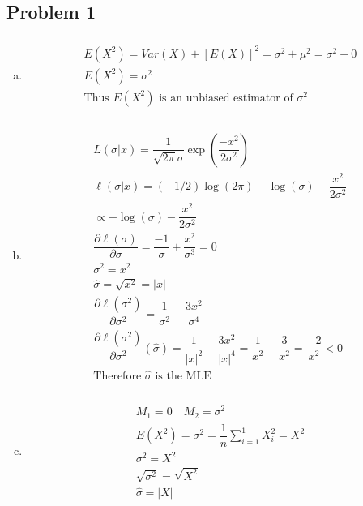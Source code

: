 \documentclass{article}
\newcommand{\sg}{\sigma}
\newcommand{\dll}[1]{\dfrac{\partial\ell({#1})}{\partial{#1}}}
\begin{document}
\begin{flushleft}

	\section*{Problem 1}
	
\begin{enumerate}[(a)]
	
	\item 
\begin{multline*}\\
E(X^2)=Var(X)+[E(X)]^2=\sigma^2+\mu^2=\sigma^2+0\\
E(X^2)=\sg^2\\
\text{Thus } E(X^2) \text{ is an unbiased estimator of } \sg^2\\
\end{multline*}

	\item 
\begin{multline*}\\
L(\sigma|x)= \dfrac{1}{\sqrt{2\pi}\sigma}\exp\left(\dfrac{-x^2}{2\sigma^2} \right)\\
\ell(\sigma|x)=(-1/2)\log(2\pi)-\log(\sigma)-\dfrac{x^2}{2\sigma^2}\\
\propto -\log(\sigma)-\dfrac{x^2}{2\sigma^2}\\
\dll{\sg}=\dfrac{-1}{\sigma}+\dfrac{x^2}{\sigma^3}=0\\
\sigma^2=x^2\\
\hat{\sigma}=\sqrt{x^2}=|x|\\
\dll{\sigma^2}=\dfrac{1}{\sigma^2}-\dfrac{3x^2}{\sg^4}\\
\dll{\sigma^2}(\hat{\sg})=\dfrac{1}{|x|^2}-\dfrac{3x^2}{|x|^4}=\dfrac{1}{x^2}-\dfrac{3}{x^2}=\dfrac{-2}{x^2}<0\\
\text{Therefore } \hat{\sg} \text{ is the MLE}\\
\end{multline*}

	\item 
\begin{multline*}\\
M_1=0 \quad M_2=\sigma^2\\
E(X^2)=\sigma^2=\dfrac{1}{n}\sum_{i=1}^{1} X_i^2=X^2\\
\sigma^2=X^2\\
\sqrt{\sg^2}=\sqrt{X^2}\\
\hat{\sg}=|X|\\
\end{multline*}


\end{enumerate}
\end{flushleft}
\end{document}

